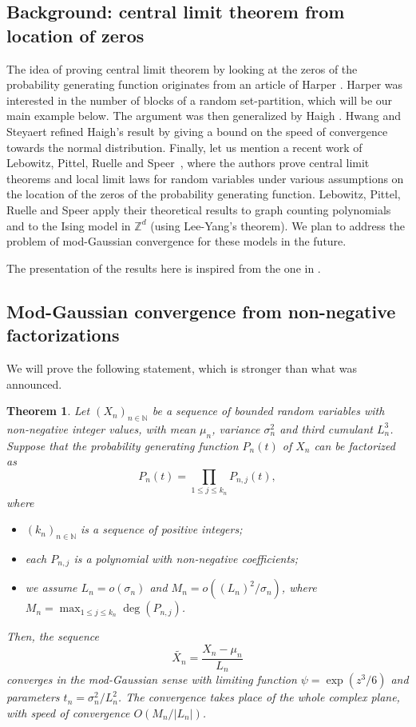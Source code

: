 \documentclass[12pt,a4paper,reqno]{amsart}
\newtheorem{theorem}[lemma]{Theorem}
\theoremstyle{remark}
\newcommand{\N}{\mathbb{N}}
\newcommand{\Z}{\mathbb{Z}}
\begin{document}
\subsection{Background: central limit theorem from location of zeros}
The idea of proving central limit theorem by looking at the zeros of the probability generating function originates from an article of Harper \cite{HarperCLTBlocks}. Harper was interested in the number of blocks of a random set-partition, which will be our main example below. The argument was then generalized by Haigh \cite{HaighTCLZeros}. Hwang and Steyaert \cite[Lemma 4]{HwangSteyaertCLTZeros} refined Haigh's result by giving a bound on the speed of convergence towards the normal distribution. Finally, let us mention a recent work of Lebowitz, Pittel, Ruelle and Speer~\cite{Lebowitz2014central}, where the authors prove central limit theorems and local limit laws for random variables under various assumptions on the location of the zeros of the probability generating function. 
Lebowitz, Pittel, Ruelle and Speer apply their theoretical results to graph counting polynomials
and to the Ising model in $\Z^d$ (using Lee-Yang's theorem). 
We plan to address the problem of mod-Gaussian convergence for these models in the future.

The presentation of the results here is inspired from the one in \cite{HwangSteyaertCLTZeros}.


\subsection{Mod-Gaussian convergence from non-negative factorizations}
We will prove the following statement, which is stronger than what was announced.
\begin{theorem}
Let $(X_n)_{n \in \N}$ be a sequence of bounded random variables with non-negative integer values, with mean $\mu_n$, variance $\sigma_n^2$ and third cumulant $L_n^3$. Suppose that the probability generating function $P_n(t)$ of $X_n$ can be factorized as
\begin{equation}
    P_n(t) = \prod_{1 \le j \le k_n} P_{n,j}(t), 
    \label{eq:factorizationPGF}
\end{equation}
where \vspace{2mm}    
\begin{itemize}
    \item $(k_n)_{n \in \N}$ is a sequence of positive integers;\vspace{2mm}
    \item each $P_{n,j}$ is a polynomial with non-negative coefficients;\vspace{2mm}
    \item we assume $L_n=o(\sigma_n)$ and $M_n=o((L_n)^2/\sigma_n)$, where $M_n=\max_{1 \le j \le k_n} \deg(P_{n,j})$.\vspace{2mm}
\end{itemize}
Then, the sequence 
\[\widetilde{X_n}=\frac{X_n - \mu_n}{L_n}\]
converges in the mod-Gaussian sense with limiting function $\psi=\exp(z^3/6)$ and parameters $t_n=\sigma_n^2/L_n^2$.
The convergence takes place of the whole complex plane, with speed of convergence $O(M_n/|L_n|)$.
\label{thm:modgaussianfromzeros}
\end{theorem}
\end{document}
